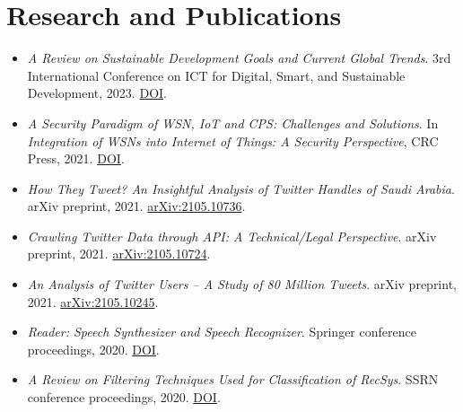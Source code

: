 \section{Research and Publications}
\begin{itemize}
  \item \textit{A Review on Sustainable Development Goals and Current Global
  Trends}. 3rd International Conference on ICT for Digital, Smart, and
  Sustainable Development, 2023.
  \href{https://doi.org/10.4108/eai.24-3-2022.2318557}{DOI}.
  \item \textit{A Security Paradigm of WSN, IoT and CPS: Challenges and
  Solutions}. In \textit{Integration of WSNs into Internet of Things: A
  Security Perspective}, CRC Press, 2021.
  \href{https://doi.org/10.1201/9781003107521-10}{DOI}.
  \item \textit{How They Tweet? An Insightful Analysis of Twitter Handles of
  Saudi Arabia}. arXiv preprint, 2021.
  \href{https://arxiv.org/abs/2105.10736}{arXiv:2105.10736}.
  \item \textit{Crawling Twitter Data through API: A Technical/Legal
  Perspective}. arXiv preprint, 2021.
  \href{https://arxiv.org/abs/2105.10724}{arXiv:2105.10724}.
  \item \textit{An Analysis of Twitter Users -- A Study of 80 Million Tweets}.
  arXiv preprint, 2021.
  \href{https://arxiv.org/abs/2105.10245}{arXiv:2105.10245}.
  \item \textit{Reader: Speech Synthesizer and Speech Recognizer}. Springer
  conference proceedings, 2020.
  \href{https://doi.org/10.1007/978-981-15-5148-2\_76}{DOI}.
  \item \textit{A Review on Filtering Techniques Used for Classification of
  RecSys}. SSRN conference proceedings, 2020.
  \href{https://doi.org/10.2139/ssrn.3563557}{DOI}.
\end{itemize}
